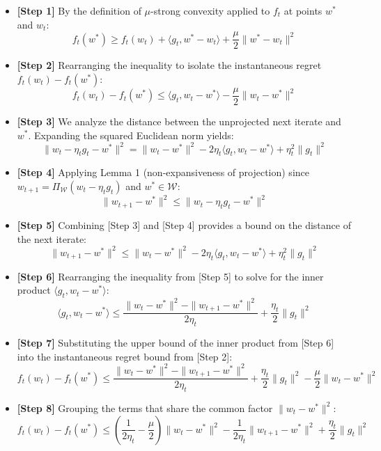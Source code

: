\documentclass[12pt]{article}
\begin{document}
\begin{itemize}
    \item \textbf{[Step 1]} By the definition of $\mu$-strong convexity applied to $f_t$ at points $w^*$ and $w_t$:
    $$f_t(w^*) \geq f_t(w_t) + \langle g_t, w^* - w_t \rangle + \frac{\mu}{2} \|w^* - w_t\|^2$$
    
    \item \textbf{[Step 2]} Rearranging the inequality to isolate the instantaneous regret $f_t(w_t) - f_t(w^*)$:
    $$f_t(w_t) - f_t(w^*) \leq \langle g_t, w_t - w^* \rangle - \frac{\mu}{2} \|w_t - w^*\|^2$$
    
    \item \textbf{[Step 3]} We analyze the distance between the unprojected next iterate and $w^*$. Expanding the squared Euclidean norm yields:
    $$\|w_t - \eta_t g_t - w^*\|^2 = \|w_t - w^*\|^2 - 2\eta_t \langle g_t, w_t - w^* \rangle + \eta_t^2 \|g_t\|^2$$
    
    \item \textbf{[Step 4]} Applying Lemma 1 (non-expansiveness of projection) since $w_{t+1} = \Pi_{\mathcal{W}}(w_t - \eta_t g_t)$ and $w^* \in \mathcal{W}$:
    $$\|w_{t+1} - w^*\|^2 \leq \|w_t - \eta_t g_t - w^*\|^2$$
    
    \item \textbf{[Step 5]} Combining [Step 3] and [Step 4] provides a bound on the distance of the next iterate:
    $$\|w_{t+1} - w^*\|^2 \leq \|w_t - w^*\|^2 - 2\eta_t \langle g_t, w_t - w^* \rangle + \eta_t^2 \|g_t\|^2$$
    
    \item \textbf{[Step 6]} Rearranging the inequality from [Step 5] to solve for the inner product $\langle g_t, w_t - w^* \rangle$:
    $$\langle g_t, w_t - w^* \rangle \leq \frac{\|w_t - w^*\|^2 - \|w_{t+1} - w^*\|^2}{2\eta_t} + \frac{\eta_t}{2} \|g_t\|^2$$
    
    \item \textbf{[Step 7]} Substituting the upper bound of the inner product from [Step 6] into the instantaneous regret bound from [Step 2]:
    $$f_t(w_t) - f_t(w^*) \leq \frac{\|w_t - w^*\|^2 - \|w_{t+1} - w^*\|^2}{2\eta_t} + \frac{\eta_t}{2} \|g_t\|^2 - \frac{\mu}{2} \|w_t - w^*\|^2$$
    
    \item \textbf{[Step 8]} Grouping the terms that share the common factor $\|w_t - w^*\|^2$:
    $$f_t(w_t) - f_t(w^*) \leq \left( \frac{1}{2\eta_t} - \frac{\mu}{2} \right) \|w_t - w^*\|^2 - \frac{1}{2\eta_t} \|w_{t+1} - w^*\|^2 + \frac{\eta_t}{2} \|g_t\|^2$$
    

\end{itemize}
\end{document}

